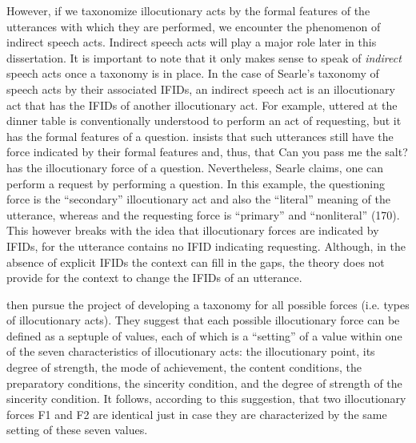 However, if we taxonomize illocutionary acts by the formal features of the utterances with which they are performed, we encounter the phenomenon of indirect speech acts. Indirect speech acts will play a major role later in this dissertation. It is important to note that it only makes sense to speak of \emph{indirect} speech acts once a taxonomy is in place. In the case of Searle’s taxonomy of speech acts by their associated IFIDs, an indirect speech act is an illocutionary act that has the IFIDs of another illocutionary act. For example,  uttered at the dinner table is conventionally understood to perform an act of requesting, but it has the formal features of a question. \textcite{searle1975indirect} insists that such utterances still have the force indicated by their formal features and, thus, that Can you pass me the salt? has the illocutionary force of a question. Nevertheless, Searle claims, one can perform a request by performing a question. In this example, the questioning force is the “secondary” illocutionary act and also the ``literal” meaning of the utterance, whereas and the requesting force is “primary” and “nonliteral” (170). This however breaks with the idea that illocutionary forces are indicated by IFIDs, for the utterance contains no IFID indicating requesting. Although, in the absence of explicit IFIDs the context can fill in the gaps, the theory does not provide for the context to change the IFIDs of an utterance. 

\textcite{searlevanderveken1985} then pursue the project of developing a taxonomy for all possible forces (i.e. types of illocutionary acts). They suggest that each possible illocutionary force can be defined as a septuple of values, each of which is a “setting” of a value within one of the seven characteristics of illocutionary acts: the illocutionary point, its degree of strength, the mode of achievement, the content conditions, the preparatory conditions, the sincerity condition, and the degree of strength of the sincerity condition. It follows, according to this suggestion, that two illocutionary forces F1 and F2 are identical just in case they are characterized by the same setting of these seven values.

